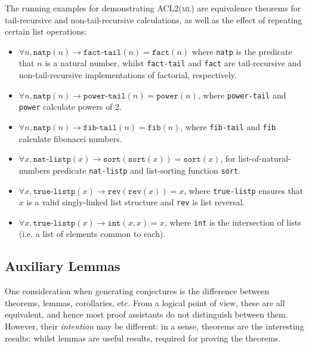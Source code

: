 The running examples for demonstrating \textsc{ACL2(ml)} are equivalence theorems for tail-recursive and non-tail-recursive calculations, as well as the effect of repeating certain list operations:

\begin{itemize}

  \item $\forall n, \texttt{natp}(n) \rightarrow \texttt{fact-tail}(n) = \texttt{fact}(n)$ where \texttt{natp} is the predicate that $n$ is a natural number, whilst \texttt{fact-tail} and \texttt{fact} are tail-recursive and non-tail-recursive implementations of factorial, respectively.

  \item $\forall n, \texttt{natp}(n) \rightarrow \texttt{power-tail}(n) = \texttt{power}(n)$,  where \texttt{power-tail} and \texttt{power} calculate powers of 2.

  \item $\forall n, \texttt{natp}(n) \rightarrow \texttt{fib-tail}(n) = \texttt{fib}(n)$,  where \texttt{fib-tail} and \texttt{fib} calculate fibonacci numbers.

  \item $\forall x, \texttt{nat-listp}(x) \rightarrow \texttt{sort}(\texttt{sort}(x)) = \texttt{sort}(x)$, for list-of-natural-numbers predicate \texttt{nat-listp} and list-sorting function \texttt{sort}.

  \item $\forall x, \texttt{true-listp}(x) \rightarrow \texttt{rev}(\texttt{rev}(x)) = x$, where \texttt{true-listp} ensures that $x$ is a valid singly-linked list structure and \texttt{rev} is list reversal.

  \item $\forall x, \texttt{true-listp}(x) \rightarrow \texttt{int}(x, x) = x$, where \texttt{int} is the intersection of lists (i.e. a list of elements common to each).

\end{itemize}

\subsection{Auxiliary Lemmas}
\label{sec:auxiliarylemmas}

One consideration when generating conjectures is the difference between theorems, lemmas, corollaries, etc. From a logical point of view, these are all equivalent, and hence most proof assistants do not distinguish between them. However, their \emph{intention} may be different: in a sense, theorems are the interesting results; whilst lemmas are useful results, required for proving the theorems.

